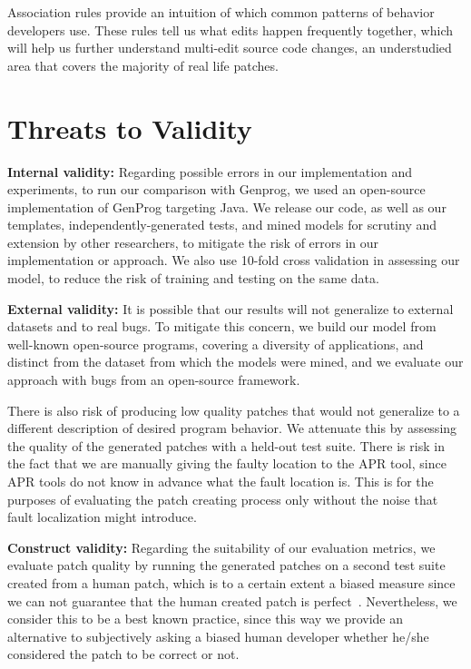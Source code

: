 \documentclass[conference]{IEEEtran}
\begin{document}
Association rules provide an intuition of which common patterns of behavior developers use. These rules tell us what edits happen frequently together, which will help us further understand multi-edit source code changes, an understudied area that covers the majority of real life patches.

\section{Threats to Validity} \label{threatsVal}

\noindent\textbf{Internal validity:}
Regarding possible errors in our implementation and experiments, to run our
comparison with Genprog, we used an open-source implementation of GenProg
targeting Java. We release our code, as well as our templates,
independently-generated tests, and mined models for scrutiny and extension by other
researchers, to mitigate the risk of errors in our implementation or approach. 
 We also use 10-fold cross validation in
assessing our model, to reduce the risk of training and testing on the same
data.  

\noindent\textbf{External validity:} 
It is possible 
that our results will not generalize to external datasets and to
real bugs. To mitigate this concern, we build our model from well-known open-source
programs, covering a diversity of applications, and distinct from the dataset
from which the models were mined, and we evaluate our approach with bugs from an open-source framework.

There is also risk of producing low quality patches that would not 
generalize
to a different description of desired program behavior. We attenuate 
this by 
assessing the quality of the generated patches with a held-out test suite.
There is risk in the fact that we are manually giving the
faulty location to the APR tool, since APR tools do not know in advance what the 
fault location is. This is for the purposes of evaluating the patch creating 
process
only without the noise that fault localization might introduce.

\noindent\textbf{Construct validity:}
Regarding the suitability of our evaluation metrics, we evaluate patch
quality by running the generated patches on a second test suite created
from a human patch, which is to a certain extent a biased measure since we can
not guarantee that the human created patch is perfect~\cite{smith15}. Nevertheless, we consider 
this to be a
best known practice, since this way we provide an alternative to subjectively 
asking a biased human developer
whether he/she considered the patch to be correct or not. 
\end{document}

